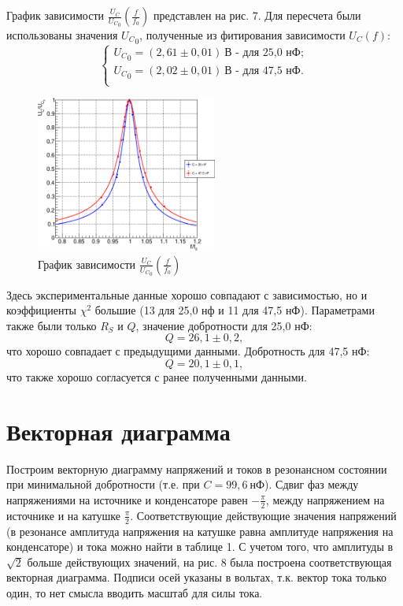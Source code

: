 \documentclass[12pt,a4paper]{article}
\begin{document}
График зависимости $\frac{U_C}{{U_C}_0}\left(\frac{f}{f_0}\right)$ представлен на рис. 7. Для пересчета были использованы значения ${U_C}_0$, полученные из фитирования зависимости $U_C(f)$:
\begin{equation}
\begin{cases}
{U_C}_0 = (2,61\pm0,01)~\text{В}\text{ - для 25,0 нФ};\\
{U_C}_0 = (2,02\pm0,01)~\text{В}\text{ - для 47,5 нФ}.\\
\end{cases}
\end{equation}
\begin{figure}
\vspace{-25pt}
\centering\includegraphics[width = 0.53\textwidth]{Plt4}
\captionsetup{justification = centering}
\caption{График зависимости $\frac{U_C}{{U_C}_0}\left(\frac{f}{f_0}\right)$\label{Fig7}}
\vspace{-15pt}
\end{figure}
Здесь экспериментальные данные хорошо совпадают с зависимостью, но и коэффициенты $\chi^2$ большие (13 для 25,0 нф  и 11 для 47,5 нФ). Параметрами также были только $R_S$ и $Q$, значение добротности для 25,0 нФ:
\begin{equation}
Q = 26,1\pm0,2,
\end{equation}
что хорошо совпадает с предыдущими данными. Добротность для 47,5 нФ:
\begin{equation}
Q = 20,1 \pm 0,1,
\end{equation}
что также хорошо согласуется с ранее полученными данными.

\section{Векторная диаграмма}
Построим векторную диаграмму напряжений и токов в резонансном состоянии при минимальной добротности (т.е. при $C = 99,6~\text{нФ}$). Сдвиг фаз между напряжениями на источнике и конденсаторе равен $-\frac{\pi}{2}$, между напряжением на источнике и на катушке $\frac{\pi}{2}$. Соответствующие действующие значения напряжений (в резонансе амплитуда напряжения на катушке равна амплитуде напряжения на конденсаторе) и тока можно найти в таблице 1. С учетом того, что амплитуды в $\sqrt{2}$ больше действующих значений, на рис. 8 была построена соответствующая векторная диаграмма. Подписи осей указаны в вольтах, т.к. вектор тока только один, то нет смысла вводить масштаб для силы тока.
\end{document}
